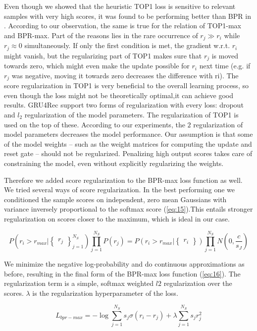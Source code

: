 Even though we showed that the heuristic TOP1 loss is sensitive to relevant samples with very high scores, it was found to be performing better than BPR in \cite{hidasi2016a}. According to our observation, the same is true for the relation of TOP1-max and BPR-max. Part of the reasons lies in the rare occurrence of $r_j \gg r_i$ while $r_j ≈ 0$ simultaneously. If only the first condition is met, the gradient w.r.t. $r_i$ might vanish, but the regularizing part of TOP1 makes sure that $r_j$ is moved towards zero, which might even make the update possible for $r_i$ next time (e.g. if $r_j$ was negative, moving it towards zero decreases the difference with ri). The score regularization in TOP1 is very beneficial to the overall learning process, so even though the loss might not be theoretically optimal,it can achieve good results. GRU4Rec support two forms of regularization with every loss: dropout and $l_2$ regularization of the model parameters. The regularization of TOP1 is used on the top of these. According to our experiments, the $2$ regularization of model parameters decreases the model performance. Our assumption is that some of the model weights – such as the weight matrices for computing the update and reset gate – should not be regularized. Penalizing high output scores takes care of constraining the model, even without explicitly regularizing the weights.


Therefore we added score regularization to the BPR-max loss function as well. We tried several ways of score regularization. In the best performing one we conditioned the sample scores on
independent, zero mean Gaussians with variance inversely proportional to the softmax score (\ref{eq:15}).This entails stronger regularization on scores closer to the maximum, which is ideal in our case.

\begin{equation}\label{eq:15}
P(r_i > r_{max}|\begin{Bmatrix}
r_j
\end{Bmatrix}_{j=1}^{N_S})\prod_{j=1}^{N_S} P(r_j) = P (r_i > r_{max}| \begin{Bmatrix}
r_i
\end{Bmatrix} ) \prod_{j=1}^{N_S} N (0, \frac{c}{s_J})
\end{equation}



We minimize the negative log-probability and do continuous approximations as before, resulting in the final form of the BPR-max loss function (\ref{eq:16}). The regularization term is a simple, softmax weighted $l2$ regularization over the scores. $\lambda$ is the regularization hyperparameter of the loss.

\begin{equation}\label{eq:16}
L_{bpr-max} = - \log \sum_{j=1}^{N_S} s_j \sigma ( r_i - r_j) + \lambda \sum_{j=1}^{N_S} s_jr^2_j
\end{equation}

